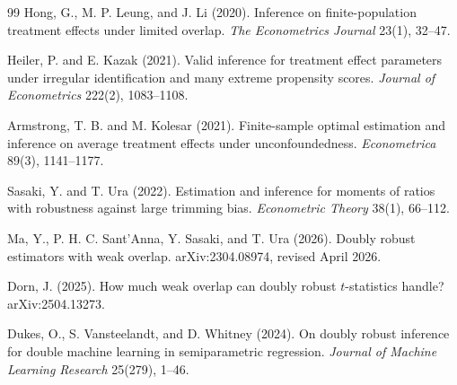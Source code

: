 \documentclass[11pt]{article}
\theoremstyle{definition}
\theoremstyle{plain}
\theoremstyle{remark}
\begin{document}
\begin{thebibliography}{99}
Hong, G., M. P. Leung, and J. Li (2020).
Inference on finite-population treatment effects under limited overlap.
\emph{The Econometrics Journal} 23(1), 32--47.

Heiler, P. and E. Kazak (2021).
Valid inference for treatment effect parameters under irregular identification
and many extreme propensity scores.
\emph{Journal of Econometrics} 222(2), 1083--1108.

Armstrong, T. B. and M. Kolesar (2021).
Finite-sample optimal estimation and inference on average treatment effects
under unconfoundedness.
\emph{Econometrica} 89(3), 1141--1177.

Sasaki, Y. and T. Ura (2022).
Estimation and inference for moments of ratios with robustness against large
trimming bias.
\emph{Econometric Theory} 38(1), 66--112.

Ma, Y., P. H. C. Sant'Anna, Y. Sasaki, and T. Ura (2026).
Doubly robust estimators with weak overlap.
arXiv:2304.08974, revised April 2026.

Dorn, J. (2025).
How much weak overlap can doubly robust \(t\)-statistics handle?
arXiv:2504.13273.

Dukes, O., S. Vansteelandt, and D. Whitney (2024).
On doubly robust inference for double machine learning in semiparametric
regression.
\emph{Journal of Machine Learning Research} 25(279), 1--46.
\end{thebibliography}
\end{document}
